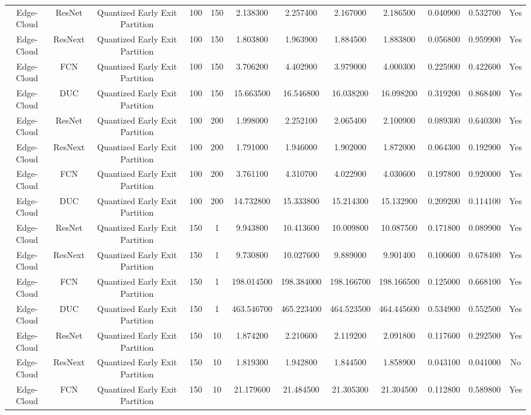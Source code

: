 \begin{tabular}{|c||c||c||c||c||c||c||c||c||c||c||c|}
Edge-Cloud & ResNet & Quantized Early Exit Partition & 100 & 150 & 2.138300 & 2.257400 & 2.167000 & 2.186500 & 0.040900 & 0.532700 & Yes \\
Edge-Cloud & ResNext & Quantized Early Exit Partition & 100 & 150 & 1.803800 & 1.963900 & 1.884500 & 1.883800 & 0.056800 & 0.959900 & Yes \\
Edge-Cloud & FCN & Quantized Early Exit Partition & 100 & 150 & 3.706200 & 4.402900 & 3.979000 & 4.000300 & 0.225900 & 0.422600 & Yes \\
Edge-Cloud & DUC & Quantized Early Exit Partition & 100 & 150 & 15.663500 & 16.546800 & 16.038200 & 16.098200 & 0.319200 & 0.868400 & Yes \\
Edge-Cloud & ResNet & Quantized Early Exit Partition & 100 & 200 & 1.998000 & 2.252100 & 2.065400 & 2.100900 & 0.089300 & 0.640300 & Yes \\
Edge-Cloud & ResNext & Quantized Early Exit Partition & 100 & 200 & 1.791000 & 1.946000 & 1.902000 & 1.872000 & 0.064300 & 0.192900 & Yes \\
Edge-Cloud & FCN & Quantized Early Exit Partition & 100 & 200 & 3.761100 & 4.310700 & 4.022900 & 4.030600 & 0.197800 & 0.920000 & Yes \\
Edge-Cloud & DUC & Quantized Early Exit Partition & 100 & 200 & 14.732800 & 15.333800 & 15.214300 & 15.132900 & 0.209200 & 0.114100 & Yes \\
Edge-Cloud & ResNet & Quantized Early Exit Partition & 150 & 1 & 9.943800 & 10.413600 & 10.009800 & 10.087500 & 0.171800 & 0.089900 & Yes \\
Edge-Cloud & ResNext & Quantized Early Exit Partition & 150 & 1 & 9.730800 & 10.027600 & 9.889000 & 9.901400 & 0.100600 & 0.678400 & Yes \\
Edge-Cloud & FCN & Quantized Early Exit Partition & 150 & 1 & 198.014500 & 198.384000 & 198.166700 & 198.166500 & 0.125000 & 0.668100 & Yes \\
Edge-Cloud & DUC & Quantized Early Exit Partition & 150 & 1 & 463.546700 & 465.223400 & 464.523500 & 464.445600 & 0.534900 & 0.552500 & Yes \\
Edge-Cloud & ResNet & Quantized Early Exit Partition & 150 & 10 & 1.874200 & 2.210600 & 2.119200 & 2.091800 & 0.117600 & 0.292500 & Yes \\
Edge-Cloud & ResNext & Quantized Early Exit Partition & 150 & 10 & 1.819300 & 1.942800 & 1.844500 & 1.858900 & 0.043100 & 0.041000 & No \\
Edge-Cloud & FCN & Quantized Early Exit Partition & 150 & 10 & 21.179600 & 21.484500 & 21.305300 & 21.304500 & 0.112800 & 0.589800 & Yes \\

\end{tabular}
